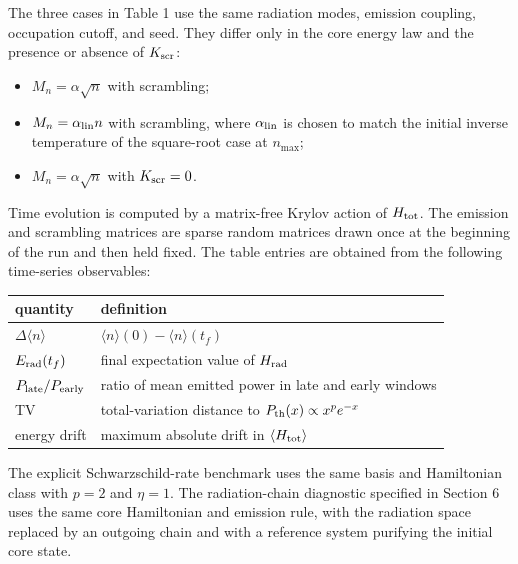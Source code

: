 \documentclass[12pt]{article}
\begin{document}
The three cases in Table 1 use the same radiation modes, emission coupling,
occupation cutoff, and seed.  They differ only in the core energy law and the
presence or absence of $K_{\rm scr}$:
\begin{itemize}
    \item $M_n=\alpha\sqrt n$ with scrambling;
    \item $M_n=\alpha_{\rm lin}n$ with scrambling, where $\alpha_{\rm lin}$ is
    chosen to match the initial inverse temperature of the square-root case at
    $n_{\max}$;
    \item $M_n=\alpha\sqrt n$ with $K_{\rm scr}=0$.
\end{itemize}

Time evolution is computed by a matrix-free Krylov action of $H_{\rm tot}$.
The emission and scrambling matrices are sparse random matrices drawn once at
the beginning of the run and then held fixed.  The table entries are obtained
from the following time-series observables:
\begin{center}
\begin{tabular}{ll}
\toprule
quantity & definition\\
\midrule
$\Delta\langle n\rangle$ & $\langle n\rangle(0)-\langle n\rangle(t_f)$\\
$E_{\rm rad}(t_f)$ & final expectation value of $H_{\rm rad}$\\
$P_{\rm late}/P_{\rm early}$ & ratio of mean emitted power in late and early windows\\
TV & total-variation distance to $P_{\rm th}(x)\propto x^p e^{-x}$\\
energy drift & maximum absolute drift in $\langle H_{\rm tot}\rangle$\\
\bottomrule
\end{tabular}
\end{center}

The explicit Schwarzschild-rate benchmark uses the same basis and Hamiltonian
class with $p=2$ and $\eta=1$.  The radiation-chain diagnostic specified in
Section 6 uses the same core Hamiltonian and emission rule, with the radiation
space replaced by an outgoing chain and with a reference system purifying the
initial core state.



\end{document}
